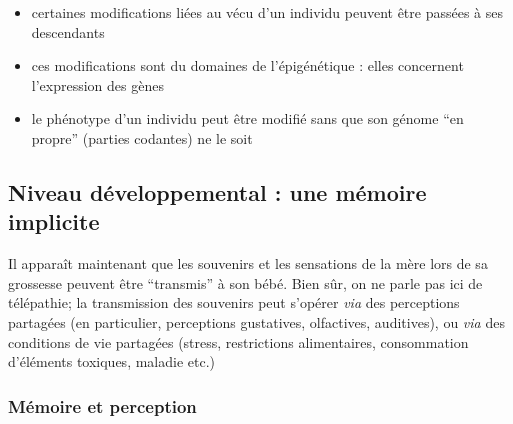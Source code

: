 \documentclass[french]{article}
\begin{document}
		
		\begin{itemize}
			\item certaines modifications liées au vécu d'un individu peuvent être passées à ses descendants
			\item ces modifications sont du domaines de l'épigénétique : elles concernent l'expression des gènes
			\item le phénotype d'un individu peut être modifié sans que son génome ``en propre'' (parties codantes) ne le soit
		\end{itemize}
		\subsection{Niveau développemental : une mémoire implicite}
			Il apparaît maintenant que les souvenirs et les sensations de la mère lors de sa grossesse peuvent être ``transmis'' à son bébé. Bien sûr, on ne parle pas ici de télépathie; la transmission des souvenirs peut s'opérer \textit{via} des perceptions partagées (en particulier, perceptions gustatives, olfactives, auditives), ou \textit{via} des conditions de vie partagées (stress, restrictions alimentaires, consommation d'éléments toxiques, maladie etc.)
			\subsubsection{Mémoire et perception}
			
\end{document}
